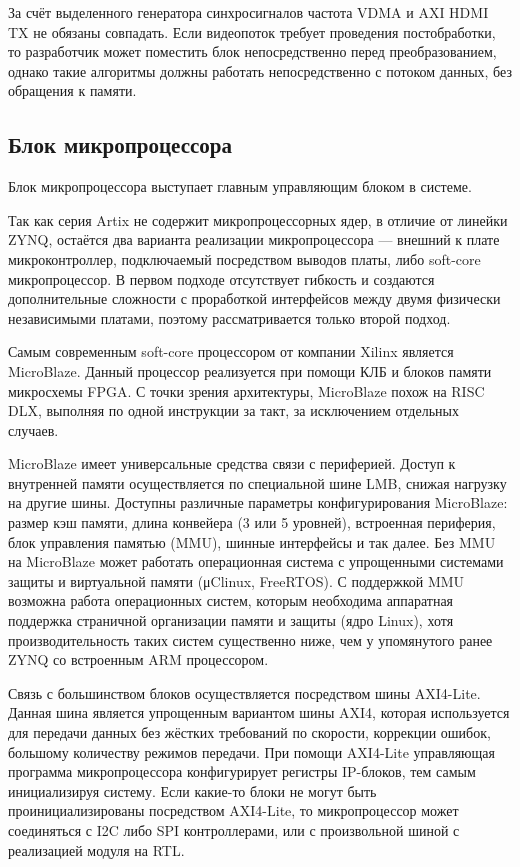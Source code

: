 За счёт выделенного генератора синхросигналов частота VDMA и AXI HDMI TX не обязаны совпадать.
Если видеопоток требует проведения постобработки, то разработчик может поместить блок непосредственно перед
преобразованием, однако такие алгоритмы должны работать непосредственно с потоком данных, без обращения к памяти.

\subsection{Блок микропроцессора}
\label{sec:structural:microprocessor}
Блок микропроцессора выступает главным управляющим блоком в системе.

Так как серия Artix не содержит микропроцессорных ядер, в отличие от линейки ZYNQ,
остаётся два варианта реализации микропроцессора --- внешний к плате микроконтроллер, подключаемый
посредством выводов платы, либо soft-core микропроцессор. В первом подходе отсутствует гибкость и создаются
дополнительные сложности с проработкой интерфейсов между двумя физически независимыми платами, поэтому
рассматривается только второй подход.

Самым современным soft-core процессором от компании Xilinx является MicroBlaze. Данный процессор реализуется
при помощи КЛБ и блоков памяти микросхемы FPGA. С точки зрения архитектуры, MicroBlaze похож на RISC DLX,
выполняя по одной инструкции за такт, за исключением отдельных случаев.

MicroBlaze имеет универсальные средства связи с периферией. Доступ к внутренней памяти осуществляется по специальной
шине LMB, снижая нагрузку на другие шины. Доступны различные параметры конфигурирования MicroBlaze:
размер кэш памяти, длина конвейера (3 или 5 уровней), встроенная периферия, блок управления памятью (MMU),
шинные интерфейсы и так далее. Без MMU на MicroBlaze может работать операционная система с упрощенными системами
защиты и виртуальной памяти (μClinux, FreeRTOS). С поддержкой MMU возможна работа операционных систем, которым необходима
аппаратная поддержка страничной организации памяти и защиты (ядро Linux), хотя производительность таких систем существенно ниже,
чем у упомянутого ранее ZYNQ со встроенным ARM процессором.

Связь с большинством блоков осуществляется посредством шины AXI4-Lite. Данная шина является упрощенным
вариантом шины AXI4, которая используется для передачи данных без жёстких требований по скорости, коррекции ошибок,
большому количеству режимов передачи. При помощи AXI4-Lite управляющая программа микропроцессора конфигурирует регистры
IP-блоков, тем самым инициализируя систему. Если какие-то блоки не могут быть проинициализированы посредством AXI4-Lite,
то микропроцессор может соединяться с I2C либо SPI контроллерами, или с произвольной шиной с реализацией модуля на RTL.

